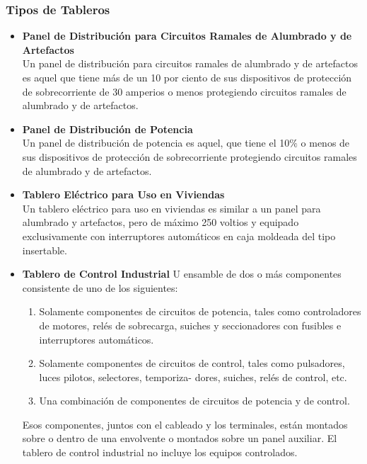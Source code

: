 \documentclass[11pt,letterpaper]{article}
\begin{document}
\subsubsection{Tipos de Tableros}
\begin{itemize}
	\item \textbf{Panel de Distribución para Circuitos Ramales de Alumbrado y de Artefactos}\\
	 Un panel de distribución para circuitos ramales de alumbrado y de artefactos es aquel que tiene más de un 10 por ciento de sus dispositivos de protec­ción de sobrecorriente de 30 amperios o menos protegiendo circuitos ramales de alumbrado y de artefactos.
	 
	\item \textbf{Panel de Distribución de Potencia}\\
 Un panel de distri­bución de potencia es aquel, que tiene el 10$\%$ o menos de sus dispositivos de protección de sobrecorriente protegiendo circuitos ramales de alumbrado y de artefactos.
 
	\item \textbf{Tablero Eléctrico para Uso en Viviendas}\\
 Un tablero eléctrico para uso en viviendas es similar a un panel para alumbrado y artefactos, pero de máximo 250 voltios y equipado exclusivamente con interruptores automáticos en caja moldeada del tipo insertable.
 
 	\item \textbf{Tablero de Control Industrial} U ensamble de dos o más componentes consistente de uno de los siguientes:
 	\begin{enumerate}
 		\item Solamente componentes de circuitos de potencia, tales como controladores de motores, relés de sobrecarga, suiches y seccionadores con fusibles e interruptores automáticos.
 		
 		\item Solamente componentes de circuitos de control, tales como pulsadores, luces pilotos, selectores, temporiza- dores, suiches, relés de control, etc.
 		
 		\item Una combinación de componentes de circuitos de potencia y de control.
 	\end{enumerate}
 	Esos componentes, juntos con el cableado y los terminales, están montados sobre o dentro de una envolvente o montados sobre un panel auxiliar. El tablero de control industrial no incluye los equipos controlados.
\end{itemize}
\end{document}
